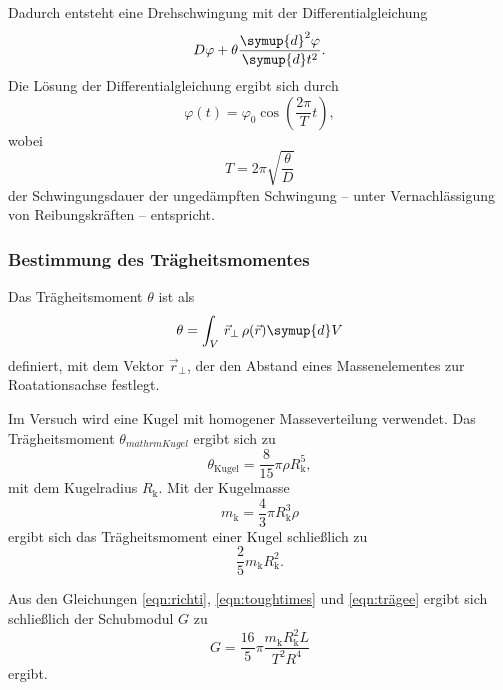 Dadurch entsteht eine Drehschwingung mit der Differentialgleichung
\begin{equation}
	D \varphi + \theta \frac{\symup{d}^2 \varphi}{\symup{d} t^2} \mathrm{.}
\end{equation}
Die Lösung der Differentialgleichung ergibt sich durch
\begin{equation}
	\varphi(t) = \varphi_0 \cos(\frac{2\pi}{T} t) \mathrm{,}
\end{equation}
wobei
\begin{equation}
	\label{eqn:toughtimes}
	T = 2\pi \sqrt{\frac{\theta}{D}}
\end{equation}
der Schwingungsdauer der ungedämpften Schwingung -- unter Vernachlässigung von 
Reibungskräften -- entspricht.

\subsubsection{Bestimmung des Trägheitsmomentes}

Das Trägheitsmoment $\theta$ ist als
\begin{equation*}
	\theta = \int_V \, \vec{r}_{\perp} \, \rho(\vec{r}) \symup{d} V
\end{equation*}
definiert, mit dem Vektor $\vec{r}_{\perp}$, der den Abstand eines Massenelementes zur 
Roatationsachse festlegt.

Im Versuch wird eine Kugel mit homogener Masseverteilung verwendet.
Das Trägheitsmoment $\theta_{mathrm{Kugel}}$ ergibt sich zu
\begin{equation*}
	\theta_{\mathrm{Kugel}} = \frac{8}{15} \pi \rho R_{\mathrm{k}}^5 \mathrm{,} 
\end{equation*}
mit dem Kugelradius $R_{\mathrm{k}}$.
Mit der Kugelmasse 
\begin{equation*}
	m_{\mathrm{k}} = \frac{4}{3} \pi R_{\mathrm{k}}^3 \rho
\end{equation*}
ergibt sich das Trägheitsmoment einer Kugel schließlich zu
\begin{equation}
	\label{eqn:trägee}
	\frac{2}{5} m_{\mathrm{k}} R_{\mathrm{k}}^2 \mathrm{.}
\end{equation}

Aus den Gleichungen \eqref{eqn:richti}, \eqref{eqn:toughtimes} und \eqref{eqn:trägee} ergibt
sich schließlich der Schubmodul $G$ zu
\begin{equation}
\label{eqn:schubischu}
	G = \frac{16}{5} \pi \frac{m_{\mathrm{k}} R_{\mathrm{k}}^2 L}{T^2 R^4}
\end{equation}
ergibt.

